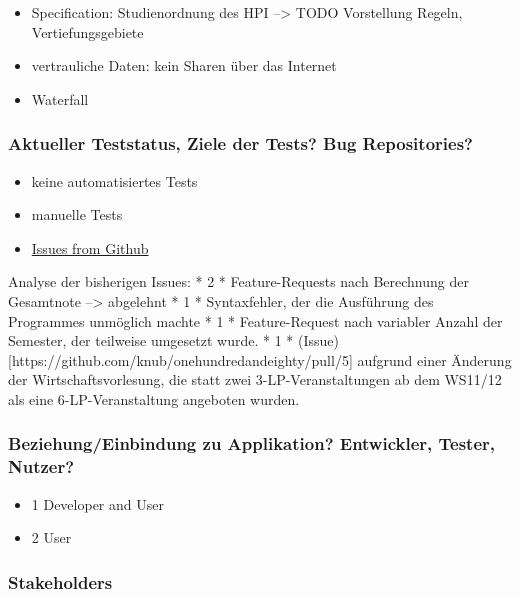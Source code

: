 \documentclass[ngerman]{article}
\begin{document}
\begin{itemize}
\itemsep1pt\parskip0pt
\item
  Specification: Studienordnung des HPI --\textgreater{} TODO
  Vorstellung Regeln, Vertiefungsgebiete
\item
  vertrauliche Daten: kein Sharen über das Internet
\item
  Waterfall
\end{itemize}

\subsubsection{Aktueller Teststatus, Ziele der Tests? Bug
Repositories?}\label{aktueller-teststatus-ziele-der-tests-bug-repositories}

\begin{itemize}
\itemsep1pt\parskip0pt
\item
  keine automatisiertes Tests
\item
  manuelle Tests
\item
  \href{https://github.com/knub/onehundredandeighty/issues?utf8=\%E2\%9C\%93\&q=is\%3Aissue}{Issues
  from Github}
\end{itemize}

Analyse der bisherigen Issues: * 2 * Feature-Requests nach Berechnung
der Gesamtnote --\textgreater{} abgelehnt * 1 * Syntaxfehler, der die
Ausführung des Programmes unmöglich machte * 1 * Feature-Request nach
variabler Anzahl der Semester, der teilweise umgesetzt wurde. * 1 *
(Issue){[}https://github.com/knub/onehundredandeighty/pull/5{]} aufgrund
einer Änderung der Wirtschaftsvorlesung, die statt zwei
3-LP-Veranstaltungen ab dem WS11/12 als eine 6-LP-Veranstaltung
angeboten wurden.

\subsubsection{Beziehung/Einbindung zu Applikation? Entwickler, Tester,
Nutzer?}\label{beziehungeinbindung-zu-applikation-entwickler-tester-nutzer}

\begin{itemize}
\itemsep1pt\parskip0pt
\item
  1 Developer and User
\item
  2 User
\end{itemize}

\subsubsection{Stakeholders}\label{stakeholders}
\end{document}
